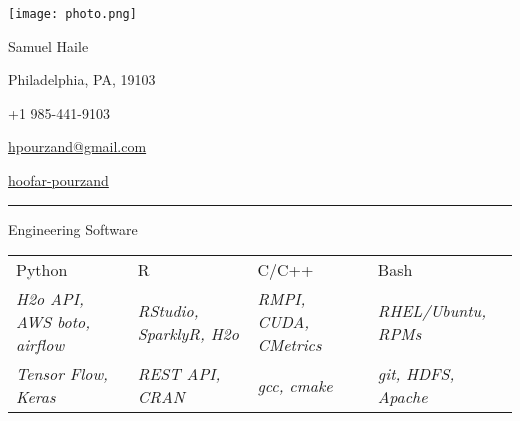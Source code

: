 \documentclass[a4paper,10pt]{article}
\newlength{\cvcolumngapwidth}
\newlength{\cvleftcolumnwidth}
\newlength{\cvrightcolumnwidth}
\newcommand{\cvnamestyle}[1]{{\Large\cvnamefont\textcolor{cvnamecolor}{#1}}}
\newcommand{\cvsectionstyle}[1]{{\normalsize\cvsectionfont\textcolor{cvsectioncolor}{#1}}}
\newcommand{\cvheadingstyle}[1]{{\normalsize\cvheadingfont\textcolor{cvheadingcolor}{#1}}}
\newlength{\cvafteritemskipamount}
\newlength{\cvaftersectionskipamount}
\newlength{\cvbetweensectionandheadingextraskipamount}
\newlength{\cvafternameskipamount}
\newlength{\cvafterpersonalinfolineskipamount}
\newlength{\cvparskip}
\newcommand{\cvpersonalinfo}[2]{
    \begin{minipage}[t]{\cvleftcolumnwidth}
        \vspace{0mm} %
        \raggedleft #1
    \end{minipage}%
    \hspace{\cvcolumngapwidth}%
    \begin{minipage}[t]{\cvrightcolumnwidth}
        \vspace{0mm} %
        #2
    \end{minipage}

    \vspace{\cvafteritemskipamount}
}
\newcommand{\cvname}[1]{
    \cvnamestyle{#1}

    \vspace{\cvafternameskipamount}
}
\newcommand{\cvpersonalinfolinewithicon}[3]{
    \raisebox{.5\fontcharht\font`E-.5\height}{\texttt{[image: \#2]}}
    #3

    \vspace{\cvafterpersonalinfolineskipamount}
}
\newcommand{\cvsection}[1]{
    \begin{minipage}[t]{\cvleftcolumnwidth}
        \raggedleft\cvsectionstyle{#1}
    \end{minipage}%
    \hspace{\cvcolumngapwidth}%
    \begin{minipage}[t]{\cvrightcolumnwidth}
        \textcolor{cvrulecolor}{\rule{\cvrightcolumnwidth}{0.3mm}}
    \end{minipage}

    \vspace{\cvaftersectionskipamount}
}
\newcommand{\cvitem}[2]{
    \begin{minipage}[t]{\cvleftcolumnwidth}
        \raggedleft #1
    \end{minipage}%
    \hspace{\cvcolumngapwidth}%
    \begin{minipage}[t]{\cvrightcolumnwidth}
        \setlength{\parskip}{\cvparskip} #2
    \end{minipage}

    \vspace{\cvafteritemskipamount}
}
\begin{document}

\cvpersonalinfo{
    \texttt{[image: photo.png]}
    }{
    \cvname{Samuel Haile}

    \cvpersonalinfolinewithicon{height=4mm}{072-location.pdf}{
        Philadelphia, PA, 19103
    }

    \cvpersonalinfolinewithicon{height=4mm}{067-phone.pdf}{
        +1 985-441-9103
    }

    \cvpersonalinfolinewithicon{height=4mm}{070-envelop.pdf}{
        \href{mailto:hpourzand@gmail.com}{hpourzand@gmail.com}
    }

    \cvpersonalinfolinewithicon{height=4mm}{458-linkedin.pdf}{
        \href{https://www.linkedin.com/in/hoofar-pourzand/}{hoofar-pourzand}
    }




}


\cvsection{\textbf{SKILLS}}

\vspace{\cvbetweensectionandheadingextraskipamount}


\cvitem{
    \cvheadingstyle{Engineering Software}

}{
        \setlength\tabcolsep{5pt}
        \begin{tabular}{|l|l|l|l|}

        Python   & R   & C/C++  & Bash \\
        \footnotesize{\emph{H2o API, AWS boto, airﬂow }} &
        \footnotesize{\emph{RStudio, SparklyR, H2o}} &
        \footnotesize{\emph{RMPI, CUDA, CMetrics }} &
        \footnotesize{\emph{RHEL/Ubuntu, RPMs}}\\

        \footnotesize{\emph{Tensor Flow, Keras}} &
         \footnotesize{\emph{REST API, CRAN}} &
         \footnotesize{\emph{gcc, cmake}} &
         \footnotesize{\emph{git, HDFS, Apache }}\\


        \end{tabular}
}
\end{document}
